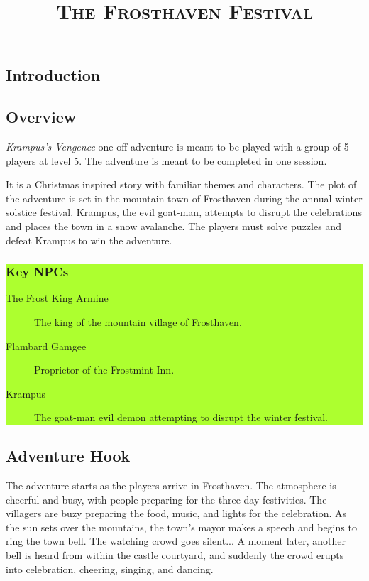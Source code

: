 \documentclass{article}
\title{\color{black}\textsc{\Huge The Frosthaven Festival }}
\date{ }
\newcommand\BackgroundPic{%
	\put(0,0){%
		\parbox[b][\paperheight]{\paperwidth}{%
			\vfill
			\centering
			\vfill
}}}
\begin{document}
	\AddToShipoutPicture*{\BackgroundPic}
	\maketitle
	\pagebreak
	\begin{multicols*}{2}
	\section{Introduction}
	
	\subsection*{Overview}
	\emph{Krampus's Vengence} one-off adventure is meant to be played with a group of 5 players at level 5. The adventure is meant to be completed in one session.
	
	It is a Christmas inspired story with familiar themes and characters. The plot of the adventure is set in the mountain town of Frosthaven during the annual winter solstice festival. Krampus, the evil goat-man, attempts to disrupt the celebrations and places the town in a snow avalanche. The players must solve puzzles and defeat Krampus to win the adventure. 
	
			\colorbox{GreenYellow}{\begin{minipage}{0.4\textwidth}
\subsubsection*{Key NPCs}
\begin{description}
	\item[The Frost King Armine] The king of the mountain village of Frosthaven.
	\item[Flambard Gamgee] Proprietor of the Frostmint Inn.
	\item[Krampus] The goat-man evil demon attempting to disrupt the winter festival. 
\end{description} 
\end{minipage}}
\break

\subsection*{Adventure Hook}

	The adventure starts as the players arrive in Frosthaven. The atmosphere is cheerful and busy, with people preparing for the three day festivities. The villagers are buzy preparing the food, music, and lights for the celebration. As the sun sets over the mountains, the town's mayor makes a speech and begins to ring the town bell. The watching crowd goes silent... A moment later, another bell is heard from within the castle courtyard, and suddenly the crowd erupts into celebration, cheering, singing, and dancing.
	

\end{multicols*}
\end{document}
